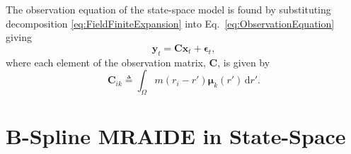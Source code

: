 \documentclass[review,authoryear,3p]{elsarticle}
\begin{document}
The observation equation of the state-space model is found by substituting decomposition \eqref{eq:FieldFiniteExpansion}
 into Eq.~\eqref{eq:ObservationEquation} giving
\begin{equation}\label{eq:ReducedObservationEquation} 
	\mathbf{y}_t = \mathbf{C}\mathbf{x}_t + \boldsymbol{\epsilon}_t,
\end{equation}
where each element of the observation matrix, $\mathbf{C}$, is given by
\begin{equation}\label{eq:Observationmatrix}
	\mathbf{C}_{ik} \triangleq \int_{\Omega}m(r_i -r')\boldsymbol{\mu}_k(r') \, \mathrm{d}r'.
\end{equation}
\section{B-Spline MRAIDE in State-Space }
\end{document}
